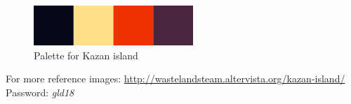 \begin{figure}[H]
  \centering
  \includegraphics[width=6cm]{Images/Palettes/kazanIsland}
  \caption{Palette for Kazan island}
\end{figure}

For more reference images: \url{http://wastelandsteam.altervista.org/kazan-island/} \\
Password: \textit{gld18}
